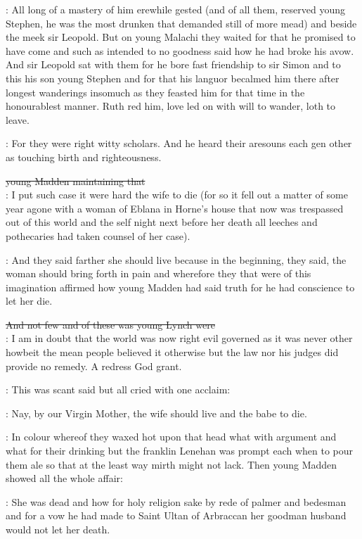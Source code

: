: All long of a mastery of him erewhile gested
(and of all them, reserved young Stephen, he was the most
drunken that demanded still of more mead) and beside the meek sir
Leopold. But on young Malachi they waited for that he promised to
have come and such as intended to no goodness said how he had broke
his avow. And sir Leopold sat with them for he bore fast friendship
to sir Simon and to this his son young Stephen and for that his languor
becalmed him there after longest wanderings insomuch as they feasted
him for that time in the honourablest manner. Ruth red him, love led
on with will to wander, loth to leave.


: For they were right witty scholars. And he heard their aresouns each
gen other as touching birth and righteousness.

\sout{young Madden maintaining that}\\
\madden: I put such case it were hard the wife to die (for so it fell out a
matter of some year agone with a woman of Eblana in Horne's house that
now was trespassed out of this world and the self night next before her
death all leeches and pothecaries had taken counsel of her case).

: And they said farther she should live because in the beginning, they
said, the woman should bring forth in pain and wherefore they that were of
this imagination affirmed how young Madden had said truth for he had
conscience to let her die.

\sout{And not few and of these was young Lynch were}\\
\lynch: I am in doubt that the world was now right evil governed as it was
never other howbeit the mean people believed it otherwise but the law nor
his judges did provide no remedy. A redress God grant.

: This was scant said but all cried with one acclaim:

\All: Nay, by our Virgin Mother, the wife should live
and the babe to die.

: In colour whereof they waxed hot upon that head what
with argument and what for their drinking but the franklin Lenehan was
prompt each when to pour them ale so that at the least way mirth might
not lack. Then young Madden showed all the whole affair:

\madden: She was dead and how for holy religion sake by rede of palmer and
bedesman and for a vow he had made to Saint Ultan of Arbraccan her
goodman husband would not let her death.

